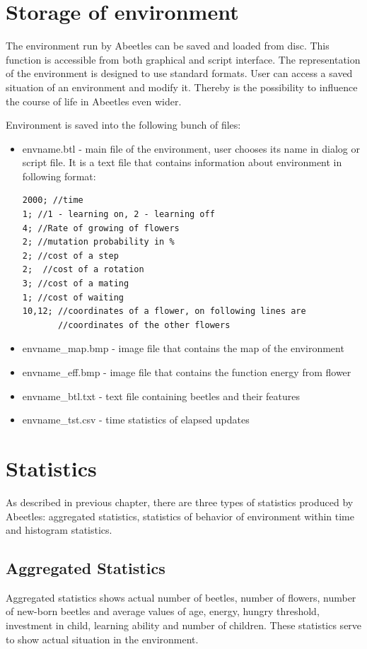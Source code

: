 \documentclass[a4paper,12pt]{report}
\begin{document}
\section{Storage of environment}

The environment run by Abeetles can be saved and loaded from disc. This function is accessible from both graphical and script interface. The representation of the environment is designed to use standard formats. User can access a saved situation of an environment and modify it. Thereby is the possibility to influence the course of life in Abeetles even wider.

Environment is saved into the following bunch of files:
\begin{itemize}
\item envname.btl - main file of the environment, user chooses its name in dialog or script file. It is a text file that contains information about environment in following format:
\begin{verbatim}
2000; //time
1; //1 - learning on, 2 - learning off
4; //Rate of growing of flowers
2; //mutation probability in %
2; //cost of a step
2;  //cost of a rotation
3; //cost of a mating
1; //cost of waiting
10,12; //coordinates of a flower, on following lines are 
       //coordinates of the other flowers 
\end{verbatim}
\item envname\_map.bmp - image file that contains the map of the environment
\item envname\_eff.bmp - image file that contains the function energy from flower 
\item envname\_btl.txt - text file containing beetles and their features 
\item envname\_tst.csv - time statistics of elapsed updates
\end{itemize}  

\section {Statistics}
As described in previous chapter, there are three types of statistics produced by Abeetles: aggregated statistics, statistics of behavior of environment within time and histogram statistics.
\subsection {Aggregated Statistics}
Aggregated statistics shows actual number of beetles, number of flowers, number of new-born beetles and average values of age, energy, hungry threshold, investment in child, learning ability and number of children. These statistics serve to show actual situation in the environment.
\end{document}
